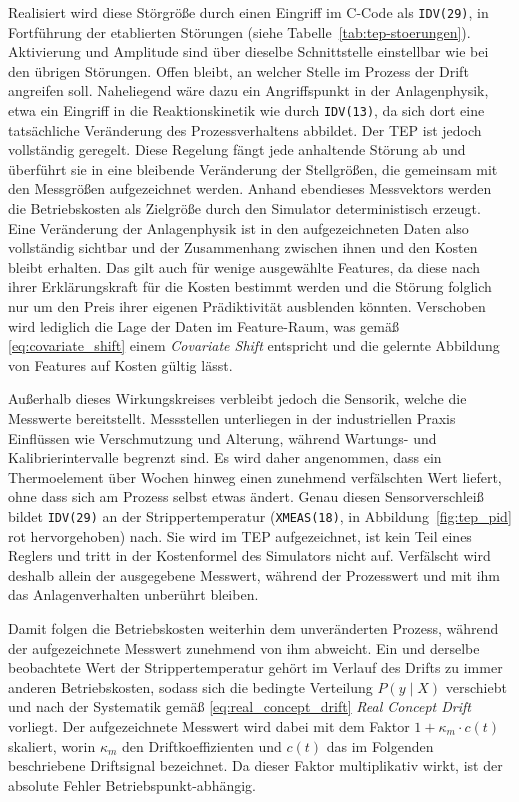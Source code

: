 %
Realisiert wird diese Störgröße durch einen Eingriff im C-Code als \texttt{IDV(29)}, in Fortführung der etablierten Störungen (siehe Tabelle~\ref{tab:tep-stoerungen}). Aktivierung und Amplitude sind über dieselbe Schnittstelle einstellbar wie bei den übrigen Störungen. Offen bleibt, an welcher Stelle im Prozess der Drift angreifen soll.
Naheliegend wäre dazu ein Angriffspunkt in der Anlagenphysik, etwa ein Eingriff in die Reaktionskinetik wie durch \texttt{IDV(13)}, da sich dort eine tatsächliche Veränderung des Prozessverhaltens abbildet. Der \ac{TEP} ist jedoch vollständig geregelt. Diese Regelung fängt jede anhaltende Störung ab und überführt sie in eine bleibende Veränderung der Stellgrößen, die gemeinsam mit den Messgrößen aufgezeichnet werden. Anhand ebendieses Messvektors werden die Betriebskosten als Zielgröße durch den Simulator deterministisch erzeugt. Eine Veränderung der Anlagenphysik ist in den aufgezeichneten Daten also vollständig sichtbar und der Zusammenhang zwischen ihnen und den Kosten bleibt erhalten. Das gilt auch für wenige ausgewählte Features, da diese nach ihrer Erklärungskraft für die Kosten bestimmt werden und die Störung folglich nur um den Preis ihrer eigenen Prädiktivität ausblenden könnten. Verschoben wird lediglich die Lage der Daten im Feature-Raum, was gemäß \eqref{eq:covariate_shift} einem \emph{Covariate Shift} entspricht und die gelernte Abbildung von Features auf Kosten gültig lässt. \par
%
Außerhalb dieses Wirkungskreises verbleibt jedoch die Sensorik, welche die Messwerte bereitstellt. Messstellen unterliegen in der industriellen Praxis Einflüssen wie Verschmutzung und Alterung, während Wartungs- und Kalibrierintervalle begrenzt sind. Es wird daher angenommen, dass ein Thermoelement über Wochen hinweg einen zunehmend verfälschten Wert liefert, ohne dass sich am Prozess selbst etwas ändert. Genau diesen Sensorverschleiß bildet \texttt{IDV(29)} an der Strippertemperatur (\texttt{XMEAS(18)}, in Abbildung~\ref{fig:tep_pid} rot hervorgehoben) nach. Sie wird im \ac{TEP} aufgezeichnet, ist kein Teil eines Reglers und tritt in der Kostenformel des Simulators nicht auf. Verfälscht wird deshalb allein der ausgegebene Messwert, während der Prozesswert und mit ihm das Anlagenverhalten unberührt bleiben. \par
%
Damit folgen die Betriebskosten weiterhin dem unveränderten Prozess, während der aufgezeichnete Messwert zunehmend von ihm abweicht. Ein und derselbe beobachtete Wert der Strippertemperatur gehört im Verlauf des Drifts zu immer anderen Betriebskosten, sodass sich die bedingte Verteilung $P(y \mid X)$ verschiebt und nach der Systematik gemäß \eqref{eq:real_concept_drift} \emph{Real Concept Drift} vorliegt. Der aufgezeichnete Messwert wird dabei mit dem Faktor $1 + \kappa_m \cdot c(t)$ skaliert, worin $\kappa_m$ den Driftkoeffizienten und $c(t)$ das im Folgenden beschriebene Driftsignal bezeichnet. Da dieser Faktor multiplikativ wirkt, ist der absolute Fehler Betriebspunkt-abhängig.

